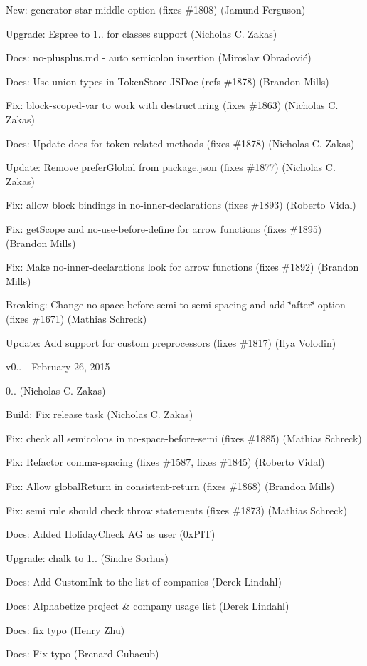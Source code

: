 \begin{DoxyItemize}
\item New\+: generator-\/star middle option (fixes \#1808) (Jamund Ferguson)
\item Upgrade\+: Espree to 1.. for classes support (Nicholas C. Zakas)
\item Docs\+: no-\/plusplus.\+md -\/ auto semicolon insertion (Miroslav Obradović)
\item Docs\+: Use union types in Token\+Store J\+S\+Doc (refs \#1878) (Brandon Mills)
\item Fix\+: block-\/scoped-\/var to work with destructuring (fixes \#1863) (Nicholas C. Zakas)
\item Docs\+: Update docs for token-\/related methods (fixes \#1878) (Nicholas C. Zakas)
\item Update\+: Remove prefer\+Global from package.\+json (fixes \#1877) (Nicholas C. Zakas)
\item Fix\+: allow block bindings in no-\/inner-\/declarations (fixes \#1893) (Roberto Vidal)
\item Fix\+: get\+Scope and no-\/use-\/before-\/define for arrow functions (fixes \#1895) (Brandon Mills)
\item Fix\+: Make no-\/inner-\/declarations look for arrow functions (fixes \#1892) (Brandon Mills)
\item Breaking\+: Change no-\/space-\/before-\/semi to semi-\/spacing and add \char`\"{}after\char`\"{} option (fixes \#1671) (Mathias Schreck)
\item Update\+: Add support for custom preprocessors (fixes \#1817) (Ilya Volodin)
\end{DoxyItemize}

v0.. -\/ February 26, 2015


\begin{DoxyItemize}
\item 0.. (Nicholas C. Zakas)
\item Build\+: Fix release task (Nicholas C. Zakas)
\item Fix\+: check all semicolons in no-\/space-\/before-\/semi (fixes \#1885) (Mathias Schreck)
\item Fix\+: Refactor comma-\/spacing (fixes \#1587, fixes \#1845) (Roberto Vidal)
\item Fix\+: Allow global\+Return in consistent-\/return (fixes \#1868) (Brandon Mills)
\item Fix\+: semi rule should check throw statements (fixes \#1873) (Mathias Schreck)
\item Docs\+: Added Holiday\+Check AG as user (0x\+P\+IT)
\item Upgrade\+: {\ttfamily chalk} to 1.. (Sindre Sorhus)
\item Docs\+: Add Custom\+Ink to the list of companies (Derek Lindahl)
\item Docs\+: Alphabetize project \& company usage list (Derek Lindahl)
\item Docs\+: fix typo (Henry Zhu)
\item Docs\+: Fix typo (Brenard Cubacub)
\end{DoxyItemize}

